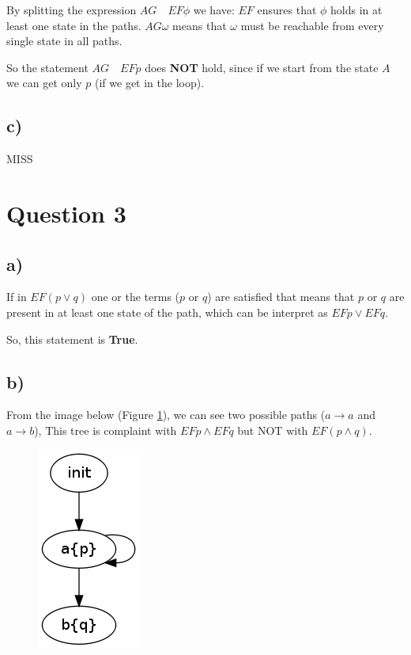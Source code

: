 \documentclass[a4paper]{article}
\begin{document}
By splitting the expression $ AG \quad EF \phi $ we have: $ EF $ ensures that $ \phi $ holds in at least one state in the paths. $AG \omega $ means that $ \omega $ must be reachable from every single state in all paths.

So the statement $AG \quad EF p $ does \textbf{NOT} hold, since if we start from the state $A$ we can get only $p$ (if we get in the loop).

\subsection*{c)}

MISS


\section{Question 3}

\subsection*{a)}

If in $EF ( p \lor q ) $ one or the terms ($p$ or $q$) are satisfied that means that $p$ or $q$ are present in at least one state of the path, which can be interpret as $EF p \lor EF q$.

So, this statement is \textbf{True}.

\subsection*{b)}

From the image below (Figure \ref{fig:3b}), we can see two possible paths ($a \to a$ and $a \to b$), This tree is complaint with $EF p \land EF q$ but NOT with $EF ( p \land q )$.

\begin{figure}[h]
		\centering
		\includegraphics[scale=0.50]{img/3b}
		\label{fig:3b}
\end{figure}
\end{document}
